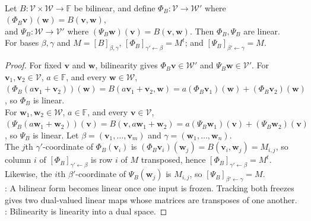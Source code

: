 \begin{proposition} \label{prop:bilinear-forms-linearize-through-duals} \\
Let $B:\mathcal{V}\times\mathcal{W}\to\mathbb{F}$ be bilinear, and define $\Phi_B:\mathcal{V}\to\mathcal{W}'$ where $(\Phi_B\mathbf{v})(\mathbf{w})=B(\mathbf{v},\mathbf{w})$,\\
and $\Psi_B:\mathcal{W}\to\mathcal{V}'$ where $(\Psi_B\mathbf{w})(\mathbf{v})=B(\mathbf{v},\mathbf{w})$. Then $\Phi_B,\Psi_B$ are linear.\\
For bases $\beta,\gamma$ and $M=[B]_{\beta,\gamma}$, $[\Phi_B]_{\gamma'\leftarrow\beta}=M^t$; and $[\Psi_B]_{\beta'\leftarrow\gamma}=M$.
\begin{proof}
For fixed $\mathbf{v}$ and $\mathbf{w}$, bilinearity gives $\Phi_B\mathbf{v}\in\mathcal{W}'$ and $\Psi_B\mathbf{w}\in\mathcal{V}'$. For $\mathbf{v}_1,\mathbf{v}_2\in\mathcal{V}$, $a\in\mathbb{F}$, and every $\mathbf{w}\in\mathcal{W}$, $(\Phi_B(a\mathbf{v}_1+\mathbf{v}_2))(\mathbf{w}) =B(a\mathbf{v}_1+\mathbf{v}_2,\mathbf{w}) =a(\Phi_B\mathbf{v}_1)(\mathbf{w})+(\Phi_B\mathbf{v}_2)(\mathbf{w})$, so $\Phi_B$ is linear.\\
For $\mathbf{w}_1,\mathbf{w}_2\in\mathcal{W}$, $a\in\mathbb{F}$, and every $\mathbf{v}\in\mathcal{V}$, $(\Psi_B(a\mathbf{w}_1+\mathbf{w}_2))(\mathbf{v}) =B(\mathbf{v},a\mathbf{w}_1+\mathbf{w}_2) =a(\Psi_B\mathbf{w}_1)(\mathbf{v})+(\Psi_B\mathbf{w}_2)(\mathbf{v})$,  so $\Psi_B$ is linear. Let $\beta=(\mathbf{v}_1,\ldots,\mathbf{v}_m)$ and $\gamma=(\mathbf{w}_1,\ldots,\mathbf{w}_n)$.\\
The $j$th $\gamma'$-coordinate of $\Phi_B(\mathbf{v}_i)$ is $(\Phi_B\mathbf{v}_i)(\mathbf{w}_j)=B(\mathbf{v}_i,\mathbf{w}_j)=M_{i,j}$, so column $i$ of $[\Phi_B]_{\gamma'\leftarrow\beta}$ is row $i$ of $M$ transposed, hence $[\Phi_B]_{\gamma'\leftarrow\beta}=M^t$. Likewise, the $i$th $\beta'$-coordinate of $\Psi_B(\mathbf{w}_j)$ is $M_{i,j}$, so $[\Psi_B]_{\beta'\leftarrow\gamma}=M$.\\
: A bilinear form becomes linear once one input is frozen. Tracking both freezes gives two dual-valued linear maps whose matrices are transposes of one another.\\
: Bilinearity is linearity into a dual space.
\end{proof}
\end{proposition}

